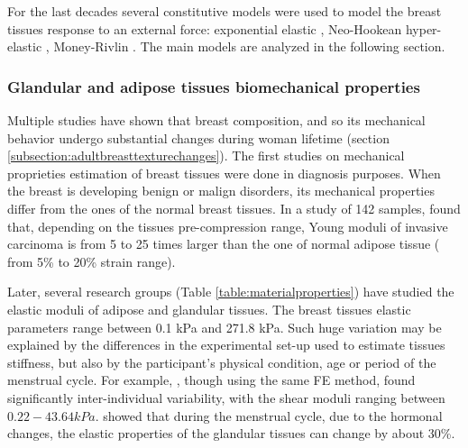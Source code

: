 For the last decades several constitutive models were used to model the breast tissues response to an external force: exponential elastic \citep{azar_methods_2002}, Neo-Hookean hyper-elastic \citep{carter_biomechanical_2009,rajagopal_modeling_2010,sturgeon_finite_element_2016, eiben_breast_2016, han_nonlinear_2014, garcia_mapping_2017}, Money-Rivlin \citep{samani_elastic_2007,tanner_factors_2006,carter_application_2012,martinez_finite_2017}. 
The main models are analyzed in the following section.
 
\subsubsection*{Glandular and adipose tissues biomechanical properties }
 Multiple studies have shown that breast composition, and so its mechanical behavior undergo substantial changes during woman lifetime (section \ref{subsection:adultbreasttexturechanges}). The first studies on mechanical proprieties estimation of breast tissues were done in diagnosis purposes. When the breast is developing benign or malign disorders, its mechanical properties differ from the ones of the normal breast tissues.  In a study of 142 samples, \cite{krouskop_elastic_1998} found that, depending on the tissues pre-compression range, Young moduli of invasive carcinoma is from 5 to 25 times larger than the one of normal adipose tissue  ( from 5\% to 20\% strain range).  

Later, several research groups (Table \ref{table:materialproperties}) have studied the elastic moduli of adipose and glandular tissues. The breast tissues elastic parameters range between 0.1 kPa and 271.8 kPa. Such huge variation may be explained by the differences in the experimental set-up used to estimate tissues stiffness, but also by the participant's physical condition, age or period of the menstrual cycle. For example, \cite{han_development_2012}, though using the same FE method, found significantly inter-individual variability, with the shear moduli ranging between $0.22-43.64 kPa$. \cite{lorenzen_menstrual-cycle_2003} showed that during the menstrual cycle, due to the hormonal changes, the elastic properties of the glandular tissues can change by about 30\%.

